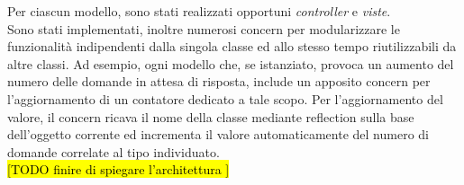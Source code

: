Per ciascun modello, sono stati realizzati opportuni \textit{controller} e \textit{viste}. \\
Sono stati implementati, inoltre numerosi \gls{concern} per modularizzare le funzionalità indipendenti dalla singola classe ed allo stesso tempo riutilizzabili da altre classi. Ad esempio, ogni modello che, se istanziato, provoca un aumento del numero delle domande in attesa di risposta, include un apposito \gls{concern} per l'aggiornamento di un contatore dedicato a tale scopo. Per l'aggiornamento del valore, il \gls{concern} ricava il nome della classe mediante \gls{reflection} sulla base dell'oggetto corrente ed incrementa il valore automaticamente del numero di domande correlate al tipo individuato.\\
\hl{[TODO finire di spiegare l'architettura ]}\\


